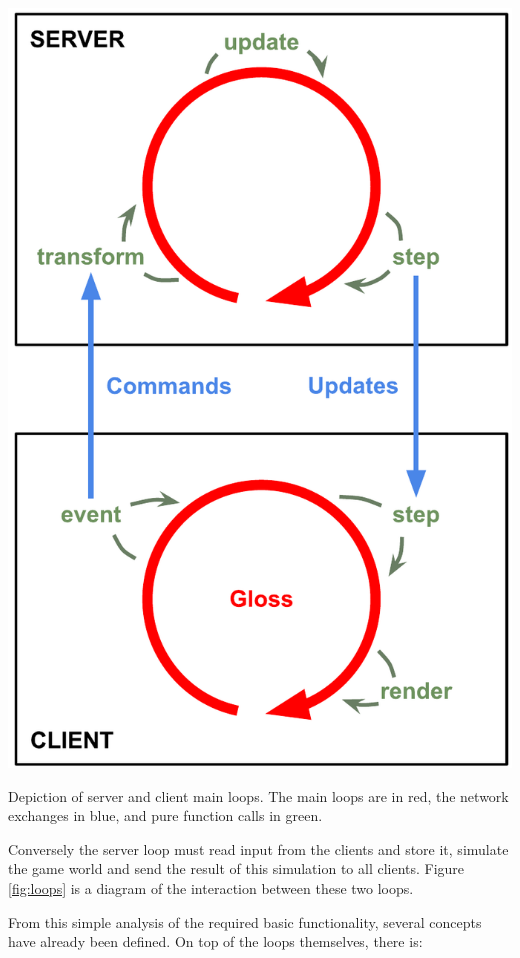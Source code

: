 \begin{marginfigure}
	\includegraphics{res/architecture.pdf}
	\caption[Depiction of server and client main loops.]{Depiction of server and client main loops. The main loops are in red, the network exchanges in blue, and pure function calls in green.}
	\label{fig:loops}
\end{marginfigure}

Conversely the server loop must read input from the clients and store it, simulate the game world and send the result of this simulation to all clients. Figure \ref{fig:loops} is a diagram of the interaction between these two loops.

From this simple analysis of the required basic functionality, several concepts have already been defined. On top of the loops themselves, there is:

